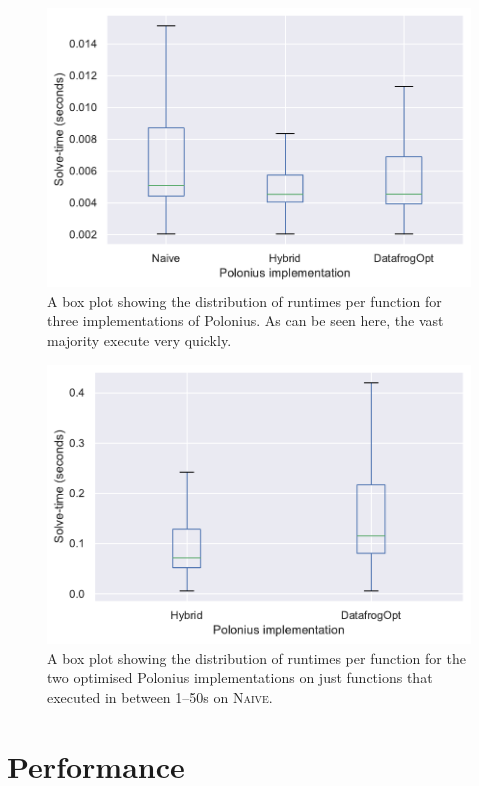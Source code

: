 \documentclass[11pt,a4paper,twoside,openany,draft]{report}
\begin{document}
\begin{figure}
  \includegraphics[width=0.9\linewidth]{Graphs/solvetimes_boxplot.pdf}
  \caption[Runtimes Per Function for Three Polonius Variants]{A box plot
    showing the distribution of runtimes per function for three
    implementations of Polonius. As can be seen here, the vast majority execute
    very quickly.}\label{fig:solvetimes}
\end{figure}


\begin{figure}
  \includegraphics[width=0.9\linewidth]{Graphs/solvetimes_boxplot_over_1s.pdf}
  \caption[Runtimes Per Function for Two Polonius Variants on Longer-Running
  Inputs]{A box plot showing the distribution of runtimes per function for the
    two optimised Polonius implementations on just functions that executed in
    between 1--50s on \textsc{Naive}.}\label{fig:solvetimes-long}
\end{figure}

\section{Performance}\label{sec:inputs:performance}
\end{document}
